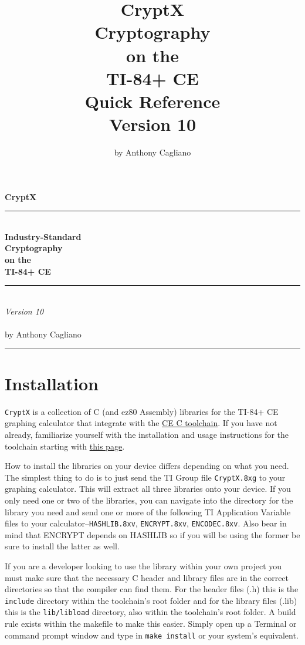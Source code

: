 \documentclass[titlepage]{article}
\title{\huge{CryptX}\\\Huge{Cryptography\\on the\\TI-84+ CE}\\\LARGE{Quick Reference}\\Version 10}
\author{by Anthony Cagliano}
\date{}
\begin{document}
	
	\begin{titlepage}
		\begin{center}
			\vspace*{2in}
			{\Large\textbf{CryptX}}
			\\\rule{.5\linewidth}{4px}\\
			{\huge\textbf{Industry-Standard\\Cryptography\\on the\\\vspace{2mm}TI-84+ CE}}
			\\\rule{.5\linewidth}{4px}\\\vspace{4mm}
			{\large\textit{Version 10}}\\\vspace{4mm}{\Large Quick Reference}\\
			\vspace*{2in}
			by Anthony Cagliano
		\end{center}
	\end{titlepage}
	\setcounter{secnumdepth}{2}
	\setcounter{tocdepth}{2}
	\tableofcontents
	\vspace{0.25in}
	\rule{1\linewidth}{2px}
	\section*{Installation}
		\texttt{CryptX} is a collection of C (and ez80 Assembly) libraries for the TI-84+ CE graphing calculator that integrate with the \underline{\href{https://github.com/CE-Programming/toolchain}{CE C toolchain}}. If you have not already, familiarize yourself with the installation and usage instructions for the toolchain starting with \underline{\href{https://ce-programming.github.io/toolchain/static/getting-started.html}{this page}}.
		
		How to install the libraries on your device differs depending on what you need. The simplest thing to do is to just send the TI Group file \texttt{CryptX.8xg} to your graphing calculator. This will extract all three libraries onto your device. If you only need one or two of the libraries, you can navigate into the directory for the library you need and send one or more of the following TI Application Variable files to your calculator--\texttt{HASHLIB.8xv}, \texttt{ENCRYPT.8xv}, \texttt{ENCODEC.8xv}. Also bear in mind that ENCRYPT depends on HASHLIB so if you will be using the former be sure to install the latter as well.
		
		If you are a developer looking to use the library within your own project you must make sure that the necessary C header and library files are in the correct directories so that the compiler can find them. For the header files (.h) this is the \texttt{include} directory within the toolchain's root folder and for the library files (.lib) this is the \texttt{lib/libload} directory, also within the toolchain's root folder. A build rule exists within the makefile to make this easier. Simply open up a Terminal or command prompt window and type in \texttt{make install} or your system's equivalent.
		
\end{document}

